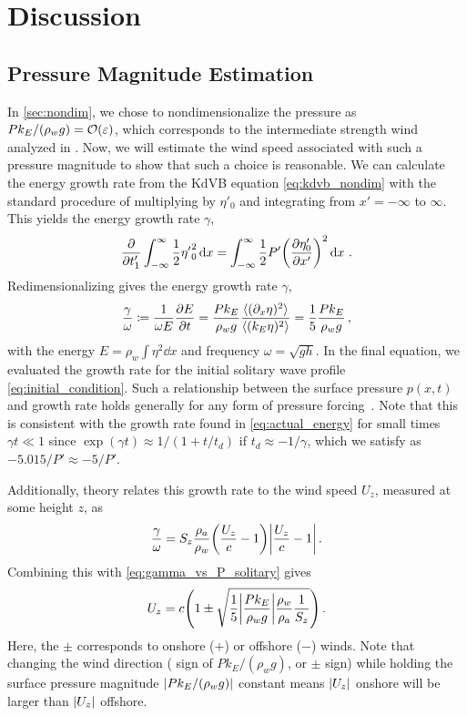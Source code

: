 \documentclass{jfm}
\renewcommand*{\epsilon}{\varepsilon}
\begin{document}
\section{Discussion}

\subsection{\label{sec:press_mag} Pressure Magnitude Estimation}
In \cref{sec:nondim}, we chose to nondimensionalize the pressure as
$P k_E/(\rho_w g) = \order{\epsilon}$, which corresponds to the
intermediate strength wind analyzed in \citet{zdyrski2020wind}.
Now, we will estimate the wind speed associated with such a pressure
magnitude to show that such a choice is reasonable.
We can calculate the energy growth rate from the KdVB equation
\cref{eq:kdvb_nondim} with the standard procedure
\citep[\eg][]{mei2005nonlinear} of multiplying by $\eta'_0$ and
integrating from $x'=-\infty$ to $\infty$.
This yields the energy growth rate $\gamma$,
\begin{equation}
  \pdv{t'_1} \int_{-\infty}^{\infty} \frac{1}{2} {\eta'}_0^2 \dd{x}
  = \int_{-\infty}^{\infty} \frac{1}{2} P' \pqty{\pdv{\eta'_0}{x'}}^2
  \dd{x} \,.
\end{equation}
Redimensionalizing gives the energy growth rate $\gamma$,
\begin{equation}
  \frac{\gamma}{\omega} \coloneqq
  \frac{1}{\omega E} \pdv{E}{t}
  = \frac{P k_E}{\rho_w g} \frac{\langle (\partial_x \eta)^2 \rangle}
    {\langle (k_E \eta)^2 \rangle}
  = \frac{1}{5} \frac{P k_E}{\rho_w g}
  \,,
  \label{eq:gamma_vs_P_solitary}
\end{equation}
with the energy $E = \rho_w \int \eta^2 \dd{x}$ and frequency $\omega =
\sqrt{gh}$.
In the final equation, we evaluated the growth rate for the initial
solitary wave profile \cref{eq:initial_condition}.
Such a relationship between the surface pressure $p(x,t)$ and growth
rate holds generally for any form of pressure
forcing~\citep[\eg][]{peirson2008wind}.
Note that this is consistent with the growth rate found in
\cref{eq:actual_energy} for small times $\gamma t \ll 1$ since
$\exp(\gamma t) \approx 1/(1+t/t_d)$ if $t_d \approx -1/\gamma$, which
we satisfy as $-5.015/P' \approx -5/P'$.

Additionally, \citet{jeffreys1925formation} theory relates this growth
rate to the wind speed $U_z$, measured at some height $z$, as
\begin{equation}
  \frac{\gamma}{\omega} = S_z \frac{\rho_a}{\rho_w}
    \pqty{\frac{U_z}{c}-1} \abs{\frac{U_z}{c}-1} \,.
  \label{eq:gamma_vs_u_jeffreys}
\end{equation}
Combining this with \cref{eq:gamma_vs_P_solitary} gives
\begin{equation}
  U_z = c \pqty{1 \pm \sqrt{\frac{1}{5} \abs{\frac{P k_E}{\rho_w g}}
    \frac{\rho_w}{\rho_a} \frac{1}{S_z}}} \,.
\end{equation}
Here, the $\pm$ corresponds to onshore ($+$) or offshore ($-$) winds.
Note that changing the wind direction (\ie{} sign of $Pk_E/(\rho_w g)$,
or $\pm$ sign) while holding the surface pressure magnitude
$\abs{Pk_E/(\rho_w g)}$ constant means $\abs{U_z}$ onshore will be
larger than $\abs{U_z}$ offshore.
\end{document}
